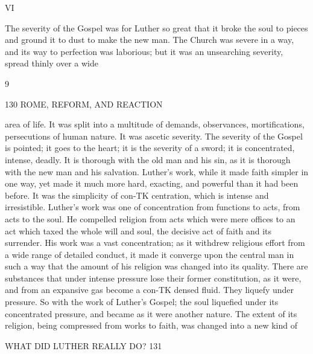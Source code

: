 \documentclass[12pt,a5paper,oneside]{book}
\begin{document}
VI 

The severity of the Gospel was for Luther so great 
that it broke the soul to pieces and ground it to dust to 
make the new man. The Church was severe in a 
way, and its way to perfection was laborious; but it 
was an unsearching severity, spread thinly over a wide 

9 



130 ROME, REFORM, AND REACTION 

area of life. It was split into a multitude of demands, 
observances, mortifications, persecutions of human 
nature. It was ascetic severity. The severity of the 
Gospel is pointed; it goes to the heart; it is the 
severity of a sword; it is concentrated, intense, deadly. 
It is thorough with the old man and his sin, as it 
is thorough with the new man and his salvation. 
Luther's work, while it made faith simpler in one way, 
yet made it much more hard, exacting, and powerful 
than it had been before. It was the simplicity of con-TK
centration, which is intense and irresistible. Luther's 
work was one of concentration from functions to acts, 
from acts to the soul. He compelled religion from 
acts which were mere offices to an act which taxed 
the whole will and soul, the decisive act of faith and 
its surrender. His work was a vast concentration; 
as it withdrew religious effort from a wide range of 
detailed conduct, it made it converge upon the central 
man in such a way that the amount of his religion was 
changed into its quality. There are substances that 
under intense pressure lose their former constitution, 
as it were, and from an expansive gas become a con-TK
densed fluid. They liquefy under pressure. So with 
the work of Luther's Gospel; the soul liquefied under 
its concentrated pressure, and became as it were another 
nature. The extent of its religion, being compressed 
from works to faith, was changed into a new kind of 



WHAT DID LUTHER REALLY DO? 131 
\end{document}
